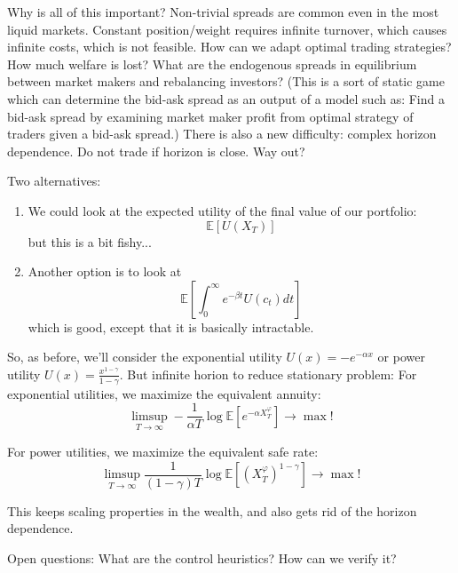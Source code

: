 Why is all of this important? Non-trivial spreads are common even in the most liquid markets. Constant position/weight requires infinite turnover, which causes infinite costs, which is not feasible. How can we adapt optimal trading strategies? How much welfare is lost? What are the endogenous spreads in equilibrium between market makers and rebalancing investors? (This is a sort of static game which can determine the bid-ask spread as an output of a model such as: Find a bid-ask spread by examining market maker profit from optimal strategy of traders given a bid-ask spread.) There is also a new difficulty: complex horizon dependence. Do not trade if horizon is close. Way out?

Two alternatives:
\begin{enumerate}
	\item We could look at the expected utility of the final value of our portfolio:
	\begin{equation}
		\mathbb{E}[U(X_T)]
	\end{equation}
	but this is a bit fishy...
	
	\item Another option is to look at
	\begin{equation}
		\mathbb{E}[ \int_0^\infty e^{-\beta t} U(c_t)dt ] 
	\end{equation}
	which is good, except that it is basically intractable.
\end{enumerate}

So, as before, we'll consider the exponential utility $U(x) = -e^{-\alpha x}$ or power utility $U(x) = \frac{x^{1-\gamma}}{1-\gamma}$. 
But infinite horion to reduce stationary problem:
	For exponential utilities, we maximize the equivalent annuity:
	\begin{equation}
		\limsup_{T\to \infty} - \frac{1}{\alpha T} \log \mathbb{E}\left[e^{-\alpha X_T^\varphi} \right] \to \max!
	\end{equation}
	
	For power utilities, we maximize the equivalent safe rate:
	\begin{equation}
		\limsup_{T\to \infty} \frac{1}{(1-\gamma) T} \log \mathbb{E}\left[ (X^\varphi_T)^{1-\gamma} \right] \to \max!
	\end{equation}

This keeps scaling properties in the wealth, and also gets rid of the horizon dependence.

Open questions: What are the control heuristics? How can we verify it?

